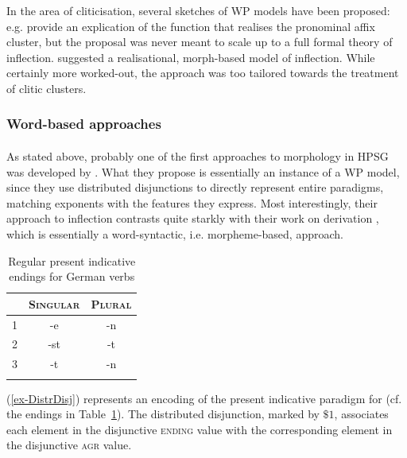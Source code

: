 \documentclass[output=paper
	        ,collection
	        ,collectionchapter
 	        ,biblatex
                ,babelshorthands
                ,newtxmath
                ,draftmode
                ,colorlinks, citecolor=brown
]{langscibook}
\begin{document}
In the area of cliticisation, several sketches of WP models have been
proposed: e.g. \citet{Miller97} provide an explication of the function
that realises the pronominal affix cluster, but the proposal was never
meant to scale up to a full formal theory of
inflection. \citet{crysmann_b03book} suggested a realisational,
morph-based model of inflection. While certainly more worked-out, the
approach was too tailored towards the treatment of clitic
clusters. 



\subsubsection{Word-based approaches}

\paragraph*{\citet{Krieger:Nerbonne:93}}
As stated above, probably one of the first approach\-es to morphology
in HPSG was developed by \citet{Krieger:Nerbonne:93}. What they
propose is essentially an instance of a WP model, since they use
distributed disjunctions to directly represent entire paradigms,
matching exponents with the features they express. Most interestingly,
their approach to inflection contrasts quite starkly with their
work on derivation \citep{Krieger:Nerbonne:93}, which is essentially a
word-syntactic, i.e. morpheme-based, approach.


\begin{table}[htb]
  \centering
  \begin{tabular}{r|cc}
    \lsptoprule
    & \textsc{Singular} & \textsc{Plural}\\
    \midrule
    1 & -e & -n\\
    2 & -st & -t\\
    3 & -t & -n\\
    \lspbottomrule
  \end{tabular}
  \caption{Regular present indicative endings for  German verbs}
  \label{tab:GermanEndings}
\end{table}

(\ref{ex-DistrDisj}) represents an encoding of the present
indicative paradigm for  (cf. the endings in Table~\ref{tab:GermanEndings}). The distributed disjunction, marked by ${\$
  1}$, associates each element in the disjunctive \textsc{ending}
value with the corresponding element in the disjunctive \textsc{agr}
value.  
\end{document}
